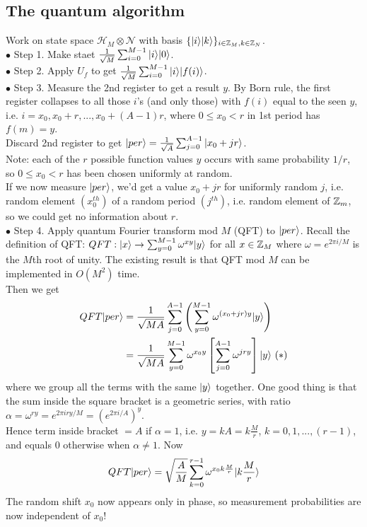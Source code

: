 \documentclass[a4paper]{article}
\begin{document}
\subsection{The quantum algorithm}
Work on state space $\mathcal{H}_M \otimes \mathcal{N}$ with basis $\{|i\rangle |k\rangle\}_{i \in \mathbb{Z}_M, k \in \mathbb{Z}_N}$.\\
$\bullet$ Step 1. Make staet $\frac{1}{\sqrt{M}}\sum_{i=0}^{M-1} |i\rangle|0\rangle$.\\
$\bullet$ Step 2. Apply $U_f$ to get $\frac{1}{\sqrt{M}} \sum_{i=0}^{M-1} |i\rangle |f(i)\rangle$.\\
$\bullet$ Step 3. Measure the 2nd register to get a result $y$. By Born rule, the first register collapses to all those $i$'s (and only those) with $f(i)$ equal to the seen $y$, i.e. $i=x_0,x_0+r,...,x_0+(A-1)r$, where $0 \leq x_0 < r$ in 1st period has $f(m)=y$.\\
Discard 2nd register to get $|per\rangle = \frac{1}{\sqrt{A}} \sum_{j=0}^{A-1}|x_0+jr\rangle$.\\
Note: each of the $r$ possible function values $y$ occurs with same probability $1/r$, so $0 \leq x_0 < r$ has been chosen uniformly at random.\\
If we now measure $|per\rangle$, we'd get a value $x_0+jr$ for uniformly random $j$, i.e. random element $(x_0^{th})$ of a random period $(j^{th})$, i.e. random element of $\mathbb{Z}_m$, so we could get no information about $r$.\\
$\bullet$ Step 4. Apply quantum Fourier transform mod $M$ (QFT) to  $|per\rangle$. Recall the definition of QFT: $QFT: |x\rangle \to \sum_{y=0}^{M-1} \omega^{xy} |y\rangle$ for all $x \in \mathbb{Z}_M$ where $\omega = e^{2\pi i/M}$ is the $M$th root of unity. The existing result is that QFT mod $M$ can be implemented in $O(M^2)$ time.\\
Then we get 
\begin{equation*}
    \begin{aligned}
    QFT |per\rangle &= \frac{1}{\sqrt{MA}} \sum_{j=0}^{A-1} \left(\sum_{y=0}^{M-1} \omega^{(x_0+jr)y}|y\rangle\right)\\
    &= \frac{1}{\sqrt{MA}} \sum_{y=0}^{M-1} \omega^{x_0y} \left[\sum_{j=0}^{A-1} \omega^{jry}\right] |y\rangle \ (*)
    \end{aligned}
\end{equation*}
where we group all the terms with the same $|y\rangle$ together. One good thing is that the sum inside the square bracket is a geometric series, with ratio $\alpha = \omega^{ry} = e^{2\pi iry/M} = (e^{2\pi i/A})^y$.\\
Hence term inside bracket $=A$ if $\alpha=1$, i.e. $y=kA = k \frac{M}{r}$, $k=0,1,...,(r-1)$, and equals $0$ otherwise when $\alpha \neq 1$. Now\\
\begin{equation*}
    \begin{aligned}
        QFT |per\rangle = \sqrt{\frac{A}{M}} \sum_{k=0}^{r-1} \omega^{x_0 k \frac{M}{r}} |k \frac{M}{r}\rangle
    \end{aligned}
\end{equation*}
The random shift $x_0$ now appears only in phase, so measurement probabilities are now independent of $x_0$!
\end{document}
